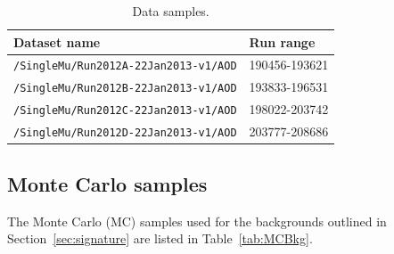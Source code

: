 \begin{table}
\begin{center}
\singlespacing
\begin{tabular}{ll}
	\hline
	Dataset name & Run range \\
	\hline
	\texttt{/SingleMu/Run2012A-22Jan2013-v1/AOD} & 190456-193621 \\
	\texttt{/SingleMu/Run2012B-22Jan2013-v1/AOD} & 193833-196531 \\
	\texttt{/SingleMu/Run2012C-22Jan2013-v1/AOD} & 198022-203742 \\
	\texttt{/SingleMu/Run2012D-22Jan2013-v1/AOD} & 203777-208686 \\
	\hline
\end{tabular}
\caption{Data samples.}
\label{tab:Data}
\end{center}
\end{table}

\subsection{Monte Carlo samples\label{sec:datasets-MC}}
The Monte Carlo (MC) samples used for the backgrounds outlined in Section~\ref{sec:signature} are listed in Table~\ref{tab:MCBkg}.


